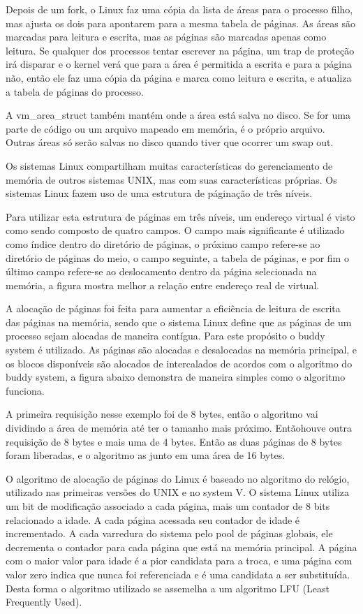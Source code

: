 Depois de um fork, o Linux faz uma cópia da lista de áreas para o processo filho, mas ajusta os dois para apontarem para a mesma tabela de páginas. As áreas são marcadas para leitura e escrita, mas as páginas são marcadas apenas como leitura. Se qualquer dos processos tentar escrever na página, um trap de proteção irá disparar e o kernel verá que para a área é permitida a escrita e para a página não, então ele faz uma cópia da página e marca como leitura e escrita, e atualiza a tabela de páginas do processo.

A vm\_area\_struct também mantém onde a área está salva no disco. Se for uma parte de código ou um arquivo mapeado em memória, é o próprio arquivo. Outras áreas só serão salvas no disco quando tiver que ocorrer um swap out.

Os sistemas Linux compartilham muitas características do gerenciamento de memória de outros sistemas UNIX, mas com suas características próprias. Os sistemas Linux fazem uso de uma estrutura de páginação de três níveis.

Para utilizar esta estrutura de páginas em três níveis, um endereço virtual é visto como sendo composto de quatro campos. O campo mais significante é utilizado como índice dentro do diretório de páginas, o próximo campo refere-se ao diretório de páginas do meio, o campo seguinte, a tabela de páginas, e por fim o último campo refere-se ao deslocamento dentro da página selecionada na memória, a figura mostra melhor a relação entre endereço real de virtual.

A alocação de páginas foi feita para aumentar a eficiência de leitura de escrita das páginas na memória, sendo que o sistema Linux define que as páginas de um processo sejam alocadas de maneira contígua. Para este propósito o buddy system é utilizado. As páginas são alocadas e desalocadas na memória principal, e os blocos disponíveis são alocados de intercalados de acordos com o algoritmo do buddy system, a figura abaixo demonstra de maneira simples como o algoritmo funciona.

A primeira requisição nesse exemplo foi de 8 bytes, então o algoritmo vai dividindo a área de memória até ter o tamanho mais próximo. Entãohouve outra requisição de 8 bytes e mais uma de 4 bytes. Então as duas páginas de 8 bytes foram liberadas, e o algoritmo as junto em uma área de 16 bytes.

O algoritmo de alocação de páginas do Linux é baseado no algoritmo do relógio, utilizado nas primeiras versões do UNIX e no system V. O sistema Linux utiliza um bit de modificação associado a cada página, mais um contador de 8 bits relacionado a idade. A cada página acessada seu contador de idade é incrementado. A cada varredura do sistema pelo pool de páginas globais, ele decrementa o contador para cada página que está na memória principal. A página com o maior valor para idade é a pior candidata para a troca, e uma página com valor zero indica que nunca foi referenciada e é uma candidata a ser substituída. Desta forma o algoritmo utilizado se assemelha a um algoritmo LFU (Least Frequently Used).
